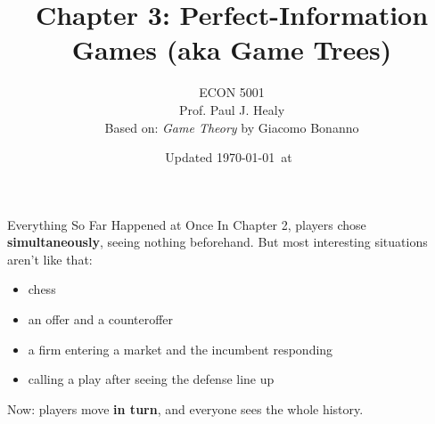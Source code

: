 

\title[Perfect Information]{Chapter 3: Perfect-Information Games (aka Game Trees)}
\author[ECON 5001]{ECON 5001\\Prof. Paul J. Healy\\Based on: \textit{Game Theory} by Giacomo Bonanno} \color{metrop}
\institute[OSU]{}
\date[]{\vfill {\tiny Updated \today\ at\ \DTMcurrenttime}}




\frame{\maketitle}

\begin{frame}{Everything So Far Happened at Once}
In Chapter 2, players chose \textbf{simultaneously}, seeing nothing beforehand.
\bsk
But most interesting situations aren't like that:
\begin{itemize}
    \item chess
    \item an offer and a counteroffer
    \item a firm entering a market and the incumbent responding
    \item calling a play after seeing the defense line up
\end{itemize}
\vfill
Now: players move \textbf{in turn}, and everyone sees the whole history.
\vspace{-0.4in}
\end{frame}


